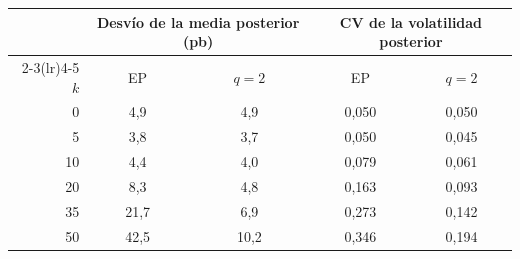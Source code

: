 \begin{tabular}{rcccc}
\toprule
 & \multicolumn{2}{c}{Desv\'io de la media posterior (pb)} & \multicolumn{2}{c}{CV de la volatilidad posterior} \\
\cmidrule(lr){2-3}\cmidrule(lr){4-5}
$k$ & EP & $q=2$ & EP & $q=2$ \\
\midrule
0 & 4{,}9 & 4{,}9 & 0{,}050 & 0{,}050 \\
5 & 3{,}8 & 3{,}7 & 0{,}050 & 0{,}045 \\
10 & 4{,}4 & 4{,}0 & 0{,}079 & 0{,}061 \\
20 & 8{,}3 & 4{,}8 & 0{,}163 & 0{,}093 \\
35 & 21{,}7 & 6{,}9 & 0{,}273 & 0{,}142 \\
50 & 42{,}5 & 10{,}2 & 0{,}346 & 0{,}194 \\
\bottomrule
\end{tabular}
